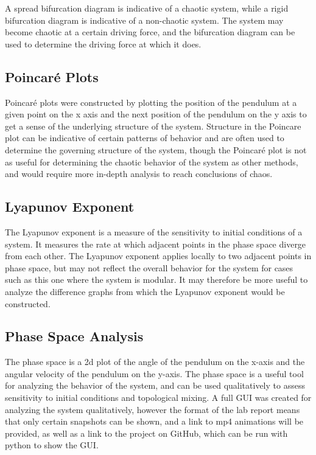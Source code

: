 \documentclass[11pt]{article} %
\begin{document}
        A spread bifurcation diagram is indicative of a chaotic system, while a rigid bifurcation diagram is indicative of a non-chaotic
        system. The system may become chaotic at a certain driving force, and the bifurcation diagram can be used to determine the
        driving force at which it does.\\
    \subsection{Poincar\'e Plots}
        Poincar\'e plots were constructed by plotting the position of the pendulum at a given point on the x axis and the next position of
        the pendulum on the y axis to get a sense of the underlying structure of the system. Structure in the Poincare plot can be indicative
        of certain patterns of behavior and are often used to determine the governing structure of the system, though the Poincar\'e plot
        is not as useful for determining the chaotic behavior of the system as other methods, and would require more in-depth analysis to reach
        conclusions of chaos.\\
    \subsection{Lyapunov Exponent}
        The Lyapunov exponent is a measure of the sensitivity to initial conditions of a system. It measures the rate at which
        adjacent points in the phase space diverge from each other. The Lyapunov exponent applies locally to two adjacent points in phase
        space, but may not reflect the overall behavior for the system for cases such as this one where the system is modular. It may therefore
        be more useful to analyze the difference graphs from which the Lyapunov exponent would be constructed.
    \subsection{Phase Space Analysis}
        The phase space is a 2d plot of the angle of the pendulum on the x-axis and the angular velocity of the pendulum on the y-axis. 
        The phase space is a useful tool for analyzing the behavior of the system, and can be used qualitatively to assess sensitivity 
        to initial conditions and topological mixing. A full GUI was created for analyzing the system qualitatively, however the format
        of the lab report means that only certain snapshots can be shown, and a link to mp4 animations will be provided, as well as a link
        to the project on GitHub, which can be run with python to show the GUI.\\
\end{document}
